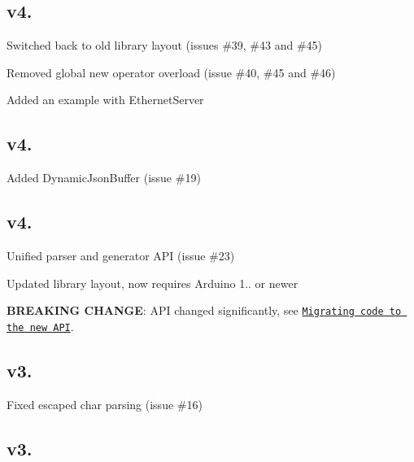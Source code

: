 \subsection*{v4. }


\begin{DoxyItemize}
\item Switched back to old library layout (issues \#39, \#43 and \#45)
\item Removed global new operator overload (issue \#40, \#45 and \#46)
\item Added an example with Ethernet\+Server
\end{DoxyItemize}

\subsection*{v4. }


\begin{DoxyItemize}
\item Added Dynamic\+Json\+Buffer (issue \#19)
\end{DoxyItemize}

\subsection*{v4. }


\begin{DoxyItemize}
\item Unified parser and generator A\+P\+I (issue \#23)
\item Updated library layout, now requires Arduino 1.. or newer
\end{DoxyItemize}

{\bfseries B\+R\+E\+A\+K\+I\+N\+G C\+H\+A\+N\+G\+E}\+: A\+P\+I changed significantly, see \href{https://github.com/bblanchon/ArduinoJson/wiki/Migrating-code-to-the-new-API}{\tt Migrating code to the new A\+P\+I}.

\subsection*{v3. }


\begin{DoxyItemize}
\item Fixed escaped char parsing (issue \#16)
\end{DoxyItemize}

\subsection*{v3. }


